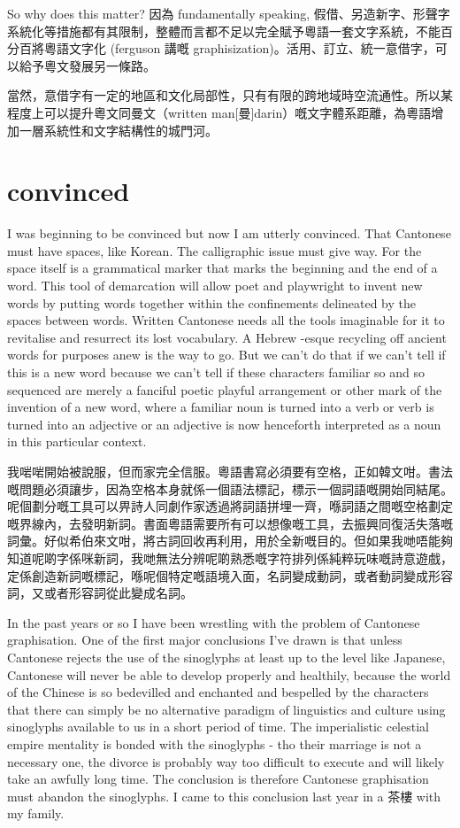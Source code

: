 \documentclass[a5paper, 10pt, openany]{book} %
\begin{document}
So why does this matter? 因為 fundamentally speaking, 假借、另造新字、形聲字系統化等措施都有其限制，整體而言都不足以完全賦予粵語一套文字系統，不能百分百將粵語文字化 (ferguson 講嘅 graphisization)。活用、訂立、統一意借字，可以給予粵文發展另一條路。

當然，意借字有一定的地區和文化局部性，只有有限的跨地域時空流通性。所以某程度上可以提升粵文同曼文（written man[曼]darin）嘅文字體系距離，為粵語增加一層系統性和文字結構性的城門河。


\chapter{convinced}
I was beginning to be convinced but now I am utterly convinced. That Cantonese must have spaces, like Korean. The calligraphic issue must give way. For the space itself is a grammatical marker that marks the beginning and the end of a word. This tool of demarcation will allow poet and playwright to invent new words by putting words together within the confinements delineated by the spaces between words. Written Cantonese needs all the tools imaginable for it to revitalise and resurrect its lost vocabulary. A Hebrew -esque recycling off ancient words for purposes anew is the way to go. But we can’t do that if we can’t tell if this is a new word because we can’t tell if these  characters familiar so and so sequenced are merely a fanciful poetic playful arrangement or other mark of the invention of a new word, where a familiar noun is turned into a verb or verb is turned into an adjective or an adjective is now henceforth interpreted as a noun in this particular context.

我啱啱開始被說服，但而家完全信服。粵語書寫必須要有空格，正如韓文咁。書法嘅問題必須讓步，因為空格本身就係一個語法標記，標示一個詞語嘅開始同結尾。呢個劃分嘅工具可以畀詩人同劇作家透過將詞語拼埋一齊，喺詞語之間嘅空格劃定嘅界線內，去發明新詞。書面粵語需要所有可以想像嘅工具，去振興同復活失落嘅詞彙。好似希伯來文咁，將古詞回收再利用，用於全新嘅目的。但如果我哋唔能夠知道呢啲字係咪新詞，我哋無法分辨呢啲熟悉嘅字符排列係純粹玩味嘅詩意遊戲，定係創造新詞嘅標記，喺呢個特定嘅語境入面，名詞變成動詞，或者動詞變成形容詞，又或者形容詞從此變成名詞。


In the past years or so I have been wrestling with the problem of Cantonese graphisation. One of the first major conclusions I've drawn is that unless Cantonese rejects the use of the sinoglyphs at least up to the level like Japanese, Cantonese will never be able to develop properly and healthily, because the world of the Chinese is so bedevilled and enchanted and bespelled by the characters that there can simply be no alternative paradigm of linguistics and culture using sinoglyphs available to us in a short period of time. The imperialistic celestial empire mentality is bonded with the sinoglyphs - tho their marriage is not a necessary one, the divorce is probably way too difficult to execute and will likely take an awfully long time. The conclusion is therefore Cantonese graphisation must abandon the sinoglyphs. I came to this conclusion last year in a 茶樓 with my family.
\end{document}
